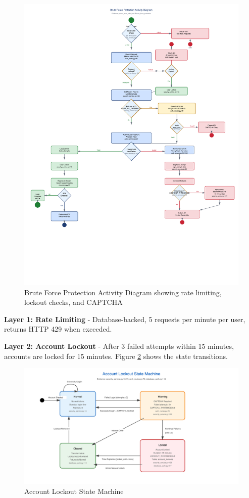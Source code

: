 \documentclass[12pt,a4paper]{article}
\begin{document}
\begin{figure}[H]
    \centering
    \includegraphics[width=\textwidth,height=0.85\textheight,keepaspectratio]{diagrams/6_brute_force_activity.png}
    \caption{Brute Force Protection Activity Diagram showing rate limiting, lockout checks, and CAPTCHA}
    \label{fig:brute_force}
\end{figure}

\textbf{Layer 1: Rate Limiting} - Database-backed, 5 requests per minute per user, returns HTTP 429 when exceeded.

\textbf{Layer 2: Account Lockout} - After 3 failed attempts within 15 minutes, accounts are locked for 15 minutes. Figure \ref{fig:lockout_state} shows the state transitions.

\begin{figure}[H]
    \centering
    \includegraphics[width=\textwidth,keepaspectratio]{diagrams/13_account_lockout_state_machine.png}
    \caption{Account Lockout State Machine}
    \label{fig:lockout_state}
\end{figure}
\end{document}
